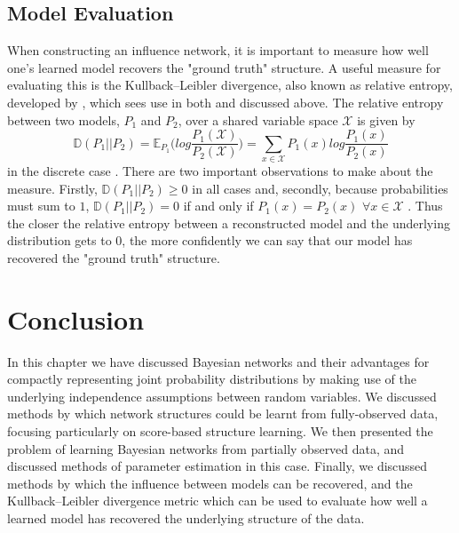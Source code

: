 \documentclass [11pt]{article}
\begin{document}
\subsection{Model Evaluation}\label{ModelEvaluation}
When constructing an influence network, it is important to measure how well one's learned model recovers the "ground truth" structure. A useful measure for evaluating this is the Kullback–Leibler divergence, also known as relative entropy, developed by \cite{kullback1951}, which sees use in both \cite{ajoodha17} and \cite{ajoodha18} discussed above. The relative entropy between two models, $P_{1}$ and $P_{2}$, over a shared variable space $\mathcal{X}$ is given by
\begin{equation*}
\mathbb{D}(P_{1}||P_{2}) = \mathbb{E}_{P_{1}}\Bigg(log\frac{P_{1}(\mathcal{X})}{P_{2}(\mathcal{X})}\Bigg) = \sum_{x\in\mathcal{X}}P_{1}(x)log\frac{P_{1}(x)}{P_{2}(x)}
\end{equation*}
in the discrete case \citep{koller09}. There are two important observations to make about the measure. Firstly, $\mathbb{D}(P_{1}||P_{2}) \geq 0$ in all cases and, secondly, because probabilities must sum to $1$, $\mathbb{D}(P_{1}||P_{2}) = 0$ if and only if $P_{1}(x) = P_{2}(x)$ $\forall x\in\mathcal{X}$ \citep{koller09}. Thus the closer the relative entropy between a reconstructed model and the underlying distribution gets to $0$, the more confidently we can say that our model has recovered the "ground truth" structure.
\section{Conclusion}
In this chapter we have discussed Bayesian networks and their advantages for compactly representing joint probability distributions by making use of the underlying independence assumptions between random variables. We discussed methods by which network structures could be learnt from fully-observed data, focusing particularly on score-based structure learning. We then presented the problem of learning Bayesian networks from partially observed data, and discussed methods of parameter estimation in this case. Finally, we discussed methods by which the influence between models can be recovered, and the Kullback–Leibler divergence metric which can be used to evaluate how well a learned model has recovered the underlying structure of the data.


\end{document}
